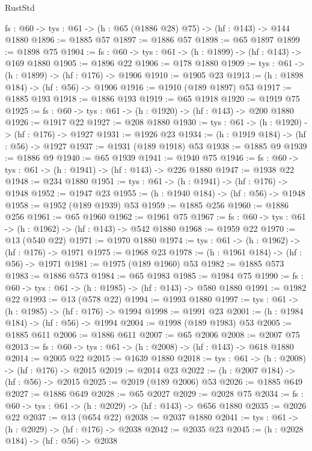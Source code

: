 \begin{lexlean}{RustStd}
\begin{coremodule}
  {fs : @60} -> {tys : @61} -> (h : @65 (@1886 @28) @75) -> (hf : @143) -> @144 @1880
@1896 := @1885 @57
@1897 := @1886 @57
@1898 := @65 @1897
@1899 := @1898 @75
@1904 := {fs : @60} -> {tys : @61} -> (h : @1899) -> (hf : @143) -> @169 @1880
@1905 := @1896 @22
@1906 := @178 @1880
@1909 := {tys : @61} -> (h : @1899) -> (hf : @176) -> @1906
@1910 := @1905 @23
@1913 := (h : @1898 @184) -> (hf : @56) -> @1906
@1916 := @1910 (@189 @1897) @53
@1917 := @1885 @193
@1918 := @1886 @193
@1919 := @65 @1918
@1920 := @1919 @75
@1925 := {fs : @60} -> {tys : @61} -> (h : @1920) -> (hf : @143) -> @200 @1880
@1926 := @1917 @22
@1927 := @208 @1880
@1930 := {tys : @61} -> (h : @1920) -> (hf : @176) -> @1927
@1931 := @1926 @23
@1934 := (h : @1919 @184) -> (hf : @56) -> @1927
@1937 := @1931 (@189 @1918) @53
@1938 := @1885 @9
@1939 := @1886 @9
@1940 := @65 @1939
@1941 := @1940 @75
@1946 := {fs : @60} -> {tys : @61} -> (h : @1941) -> (hf : @143) -> @226 @1880
@1947 := @1938 @22
@1948 := @234 @1880
@1951 := {tys : @61} -> (h : @1941) -> (hf : @176) -> @1948
@1952 := @1947 @23
@1955 := (h : @1940 @184) -> (hf : @56) -> @1948
@1958 := @1952 (@189 @1939) @53
@1959 := @1885 @256
@1960 := @1886 @256
@1961 := @65 @1960
@1962 := @1961 @75
@1967 := {fs : @60} -> {tys : @61} -> (h : @1962) -> (hf : @143) -> @542 @1880
@1968 := @1959 @22
@1970 := @13 (@540 @22)
@1971 := @1970 @1880
@1974 := {tys : @61} -> (h : @1962) -> (hf : @176) -> @1971
@1975 := @1968 @23
@1978 := (h : @1961 @184) -> (hf : @56) -> @1971
@1981 := @1975 (@189 @1960) @53
@1982 := @1885 @573
@1983 := @1886 @573
@1984 := @65 @1983
@1985 := @1984 @75
@1990 := {fs : @60} -> {tys : @61} -> (h : @1985) -> (hf : @143) -> @580 @1880
@1991 := @1982 @22
@1993 := @13 (@578 @22)
@1994 := @1993 @1880
@1997 := {tys : @61} -> (h : @1985) -> (hf : @176) -> @1994
@1998 := @1991 @23
@2001 := (h : @1984 @184) -> (hf : @56) -> @1994
@2004 := @1998 (@189 @1983) @53
@2005 := @1885 @611
@2006 := @1886 @611
@2007 := @65 @2006
@2008 := @2007 @75
@2013 := {fs : @60} -> {tys : @61} -> (h : @2008) -> (hf : @143) -> @618 @1880
@2014 := @2005 @22
@2015 := @1639 @1880
@2018 := {tys : @61} -> (h : @2008) -> (hf : @176) -> @2015
@2019 := @2014 @23
@2022 := (h : @2007 @184) -> (hf : @56) -> @2015
@2025 := @2019 (@189 @2006) @53
@2026 := @1885 @649
@2027 := @1886 @649
@2028 := @65 @2027
@2029 := @2028 @75
@2034 := {fs : @60} -> {tys : @61} -> (h : @2029) -> (hf : @143) -> @656 @1880
@2035 := @2026 @22
@2037 := @13 (@654 @22)
@2038 := @2037 @1880
@2041 := {tys : @61} -> (h : @2029) -> (hf : @176) -> @2038
@2042 := @2035 @23
@2045 := (h : @2028 @184) -> (hf : @56) -> @2038

\end{coremodule}
\end{lexlean}
